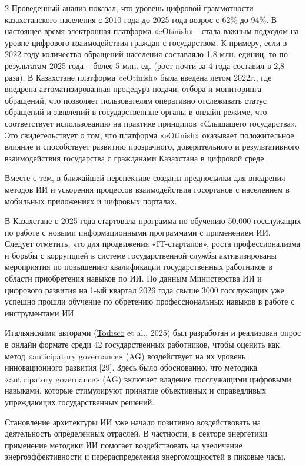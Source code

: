 \begin{multicols}{2}
Проведенный анализ показал, что уровень цифровой граммотности
казахстанского населения с 2010 года до 2025 года возрос с 62\% до 94\%.
В настоящее время электронная платформа «eOtinish» - стала важным
подходом на уровне цифрового взаимодействия граждан с государством. К
примеру, если в 2022 году количество обращений населения составляло 1.8
млн. единиц, то по результатам 2025 года -- более 5 млн. ед. (рост почти
за 4 года составил в 2,8 раза). В Казахстане платформа «eOtinish» была
введена летом 2022г., где внедрена автоматизированная процедура подачи,
отбора и мониторинга обращений, что позволяет пользователям оперативно
отслеживать статус обращений и заявлений в государственные органы в
онлайн режиме, что соответствует использованию на практике принципов
«Слышащего государства». Это свидетельствует о том, что платформа
«eOtinish» оказывает положительное влияние и способствует развитию
прозрачного, доверительного и результативного взаимодействия государства
с гражданами Казахстана в цифровой среде.

Вместе с тем, в ближайшей перспективе созданы предпосылки для внедрения
методов ИИ и ускорения процессов взаимодействия госорганов с населением
в мобильных приложениях и цифровых порталах.

В Казахстане с 2025 года стартовала программа по обучению 50.000
госслужащих по работе с новыми информационными программами с применением
ИИ. Следует отметить, что для продвижения «IT-стартапов», роста
профессионализма и борьбы с коррупцией в системе государственной службы
активизированы мероприятия по повышению квалификации государственных
работников в области приобретения навыков по ИИ. По данным Министерства
ИИ и цифрового развития на 1-ый квартал 2026 года свыше 3000 госслужащих
уже успешно прошли обучение по обретению профессиональных навыков в
работе с инструментами ИИ. 

Итальянскими авторами (\href{javascript:;}{Todisco} et al., 2025) был
разработан и реализован опрос в онлайн формате среди 42 государственных
работников, чтобы оценить как метод «anticipatory governance» (AG)
воздействует на их уровень инновационного развития {[}29{]}. Здесь было
обоснованно, что методика «anticipatory governance» (AG) включает
владение госслужащими цифровыми навыками, которые стимулируют принятие
объективных и справедливых упреждающих государственных решений.

Становление архитектуры ИИ уже начало позитивно воздействовать на
деятельность определенных отраслей. В частности, в секторе энергетики
применение методики ИИ помогает воздействовать на увеличение
энергоэффективности и перераспределения энергомощностей в пиковые часы.


\end{multicols}
